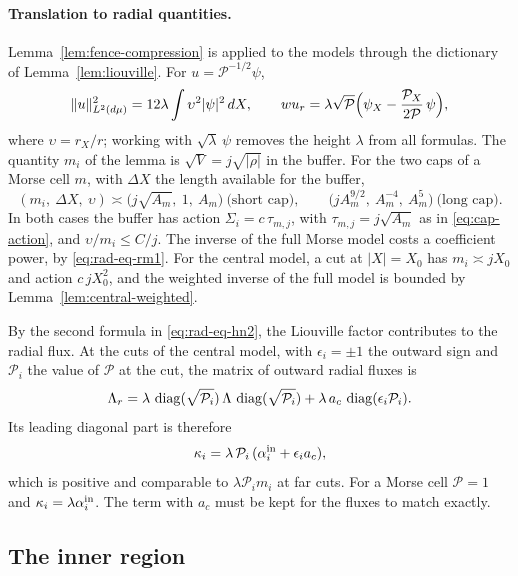 \paragraph{Translation to radial quantities.}
Lemma~\ref{lem:fence-compression} is applied to the models through the
dictionary of Lemma~\ref{lem:liouville}. For $u=\mathcal P^{-1/2}\psi$,
\begin{equation}\label{eq:rad-eq-hn2}
 \|u\|_{L^2(d\mu)}^2=12\lambda\int\upsilon^2|\psi|^2\,dX,
 \qquad wu_r=\lambda\sqrt{\mathcal P}
       \Bigl(\psi_X-\frac{\mathcal P_X}{2\mathcal P}\,\psi\Bigr),
\end{equation}
where $\upsilon=r_X/r$; working with $\sqrt\lambda\,\psi$ removes the
height $\lambda$ from all formulas. The quantity $m_i$ of the lemma is
$\sqrt V=j\sqrt{|\rho|}$ in the buffer. For the two caps of a Morse
cell $m$, with $\Delta X$ the length available for the buffer,
\[
 (m_i,\ \Delta X,\ \upsilon)\asymp
 \bigl(j\sqrt{A_m},\ 1,\ A_m\bigr)\ \text{(short cap)},\qquad
 \bigl(jA_m^{9/2},\ A_m^{-4},\ A_m^5\bigr)\ \text{(long cap)}.
\]
In both cases the buffer has action $\Sigma_i=c\,\tau_{m,j}$, with
$\tau_{m,j}=j\sqrt{A_m}$ as in \eqref{eq:cap-action}, and
$\upsilon/m_i\le C/j$. The inverse of the full Morse model costs a
coefficient power, by \eqref{eq:rad-eq-rm1}. For the central model, a
cut at $|X|=X_0$ has $m_i\asymp jX_0$ and action $c\,jX_0^2$, and the
weighted inverse of the full model is bounded by
Lemma~\ref{lem:central-weighted}.

By the second formula in \eqref{eq:rad-eq-hn2}, the Liouville factor
contributes to the radial flux. At the cuts of the central model, with
$\epsilon_i=\pm1$ the outward sign and $\mathcal P_i$ the value of
$\mathcal P$ at the cut, the matrix of outward radial fluxes is
\begin{equation}\label{eq:rad-eq-hn3}
 \Lambda_r=\lambda\,\operatorname{diag}(\sqrt{\mathcal P_i})\,
                  \Lambda\,\operatorname{diag}(\sqrt{\mathcal P_i})
          +\lambda\,a_c\,\operatorname{diag}(\epsilon_i\mathcal P_i).
\end{equation}
Its leading diagonal part is therefore
\begin{equation}\label{eq:kappa-def}
 \kappa_i=\lambda\,\mathcal P_i\,(\alpha_i^{\rm in}+\epsilon_ia_c),
\end{equation}
which is positive and comparable to $\lambda\mathcal P_im_i$ at far
cuts. For a Morse cell $\mathcal P=1$ and
$\kappa_i=\lambda\alpha_i^{\rm in}$. The term with $a_c$ must be kept
for the fluxes to match exactly.

\subsection{The inner region}
\label{subsec:rad-localized-hilbert-assembly}

